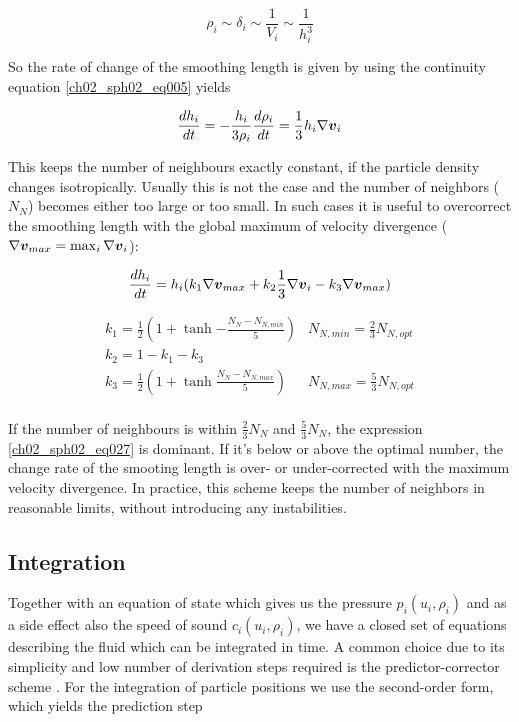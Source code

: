 \begin{equation}
\label{ch02_sph02_eq026}
\rho_i \sim \delta_i \sim \frac{1}{V_i} \sim \frac{1}{h_i^3}
\end{equation}

So the rate of change of the smoothing length is given by using the continuity equation \ref{ch02_sph02_eq005} yields

\begin{equation}
\label{ch02_sph02_eq027}
\frac{d h_i}{dt} = - \frac{h_i}{3 \rho_i} \frac{d \rho_i}{dt} = \frac{1}{3} h_i \nabla \boldsymbol{v}_i
\end{equation}

This keeps the number of neighbours exactly constant, if the particle density changes isotropically. Usually this is not the case and the number of neighbors ($N_N$) becomes either too large or too small. In such cases it is useful to overcorrect the smoothing length with the global maximum of velocity divergence ($\nabla \boldsymbol{v}_{max} = \max_{i} \nabla \boldsymbol{v}_i$):

\begin{equation}
\label{ch02_sph01_eq028}
\frac{d h_i}{d t} = h_i ( k_1 \nabla \boldsymbol{v}_{max}+ k_2 \frac{1}{3} \nabla\boldsymbol{v}_i - k_3 \nabla \boldsymbol{v}_{max} )
\end{equation}

\begin{equation}
\label{ch02_sph01_eq029}
\begin{array}{ll}
k_1 = \frac{1}{2} (1 + \tanh{- \frac{N_N - N_{N,min}}{5}} ) & N_{N,min} = \frac{2}{3} N_{N,opt} \\
k_2 = 1 - k_1 - k_3 & \\
k_3 = \frac{1}{2} (1 + \tanh{\frac{N_N - N_{N,max}}{5}} ) & N_{N,max} = \frac{5}{3} N_{N,opt}\\
\end{array}
\end{equation}

If the number of neighbours is within $\frac{2}{3} N_N$ and $\frac{5}{3} N_N$, the expression \ref{ch02_sph02_eq027} is dominant. If it's below or above the optimal number, the change rate of the smooting length is over- or under-corrected with the maximum velocity divergence. In practice, this scheme keeps the number of neighbors in reasonable limits, without introducing any instabilities.

\subsection{Integration}
Together with an equation of state which gives us the pressure $p_i(u_i, \rho_i)$ and as a side effect also the speed of sound $c_i(u_i, \rho_i)$, we have a closed set of equations describing the fluid which can be integrated in time. A common choice due to its simplicity and low number of derivation steps required is the predictor-corrector scheme \citep{Press2002nrc..book.....P}. For the integration of particle positions we use the second-order form, which yields the prediction step

